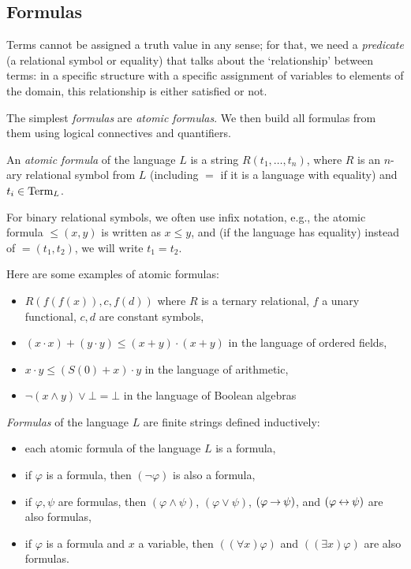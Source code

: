 \subsection{Formulas}

Terms cannot be assigned a truth value in any sense; for that, we need a \emph{predicate} (a relational symbol or equality) that talks about the `relationship' between terms: in a specific structure with a specific assignment of variables to elements of the domain, this relationship is either satisfied or not.

The simplest \emph{formulas} are \emph{atomic formulas}. We then build all formulas from them using logical connectives and quantifiers.

\begin{definition}
    An \emph{atomic formula} of the language $L$ is a string $R(t_1,\dots,t_n)$, where $R$ is an $n$-ary relational symbol from $L$ (including $=$ if it is a language with equality) and $t_i\in\operatorname{Term}_L$. %
\end{definition}

For binary relational symbols, we often use infix notation, e.g., the atomic formula $\leq(x,y)$ is written as $x\leq y$, and (if the language has equality) instead of $=(t_1,t_2)$, we will write $t_1=t_2$.

\begin{example}
    Here are some examples of atomic formulas:
    \begin{itemize}
        \item $R(f(f(x)),c, f(d))$ where $R$ is a ternary relational, $f$ a unary functional, $c,d$ are constant symbols,
        \item $(x\cdot x)+(y\cdot y)\leq (x+y)\cdot(x+y)$ in the language of ordered fields,
        \item $x\cdot y\leq (S(0)+x)\cdot y$ in the language of arithmetic,
        \item $\neg(x\land y)\lor\bot=\bot$ in the language of Boolean algebras        
    \end{itemize}
\end{example}

\begin{definition}[Formula]
    \emph{Formulas} of the language $L$ are finite strings defined inductively: 
    \begin{itemize}
        \item each atomic formula of the language $L$ is a formula,
        \item if $\varphi$ is a formula, then $(\neg\varphi)$ is also a formula,
        \item if $\varphi,\psi$ are formulas, then $(\varphi\land\psi)$, $(\varphi\lor\psi)$, $(\varphi\mathbin{\rightarrow}\psi)$, and $(\varphi\mathbin{\leftrightarrow}\psi)$ are also formulas,
        \item if $\varphi$ is a formula and $x$ a variable, then $((\forall x)\varphi)$ and $((\exists x)\varphi)$ are also formulas.
        \end{itemize}    
\end{definition}

